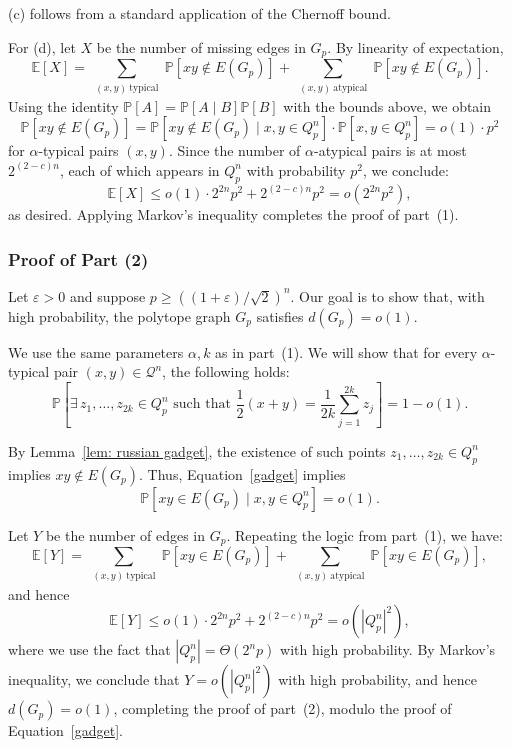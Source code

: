 \documentclass[11pt]{article}
\theoremstyle{definition}
\theoremstyle{plain}
\begin{document}
(c) follows from a standard application of the Chernoff bound.

For (d), let \( X \) be the number of missing edges in \( G_p \). By linearity of expectation,
\[
\mathbb{E}[X] = \sum_{\substack{(x, y)\ \text{typical}}} \mathbb{P}[xy \notin E(G_p)] + \sum_{\substack{(x, y)\ \text{atypical}}} \mathbb{P}[xy \notin E(G_p)].
\]
Using the identity \( \mathbb{P}[A] = \mathbb{P}[A \mid B]  \mathbb{P}[B] \) with the bounds above, we obtain
\[
\mathbb{P}[xy \notin E(G_p)] = \mathbb{P}[xy \notin E(G_p) \mid x, y \in Q_p^n] \cdot \mathbb{P}[x, y \in Q_p^n] = o(1) \cdot p^2
\]
for \(\alpha\)-typical pairs \( (x, y) \). Since the number of \(\alpha\)-atypical pairs is at most \( 2^{(2 - c)n} \), each of which appears in \( Q_p^n \) with probability \( p^2 \), we conclude:
\[
\mathbb{E}[X] \leq o(1) \cdot 2^{2n}p^2 + 2^{(2 - c)n}p^2 = o(2^{2n}p^2),
\]
as desired. Applying Markov’s inequality completes the proof of part~(1).


\subsubsection*{Proof of Part (2)}

Let \( \varepsilon > 0 \) and suppose \( p \geq \left((1 + \varepsilon)/\sqrt{2}\right)^n \). Our goal is to show that, with high probability, the polytope graph \( G_p \) satisfies \( d(G_p) = o(1) \).

We use the same parameters \( \alpha, k \) as in part~(1). We will show that for every \(\alpha\)-typical pair \( (x, y) \in \mathcal{Q}^n \), the following holds:
\begin{equation} \label{gadget}
    \mathbb{P}\left[\exists\, z_1, \ldots, z_{2k} \in Q_p^n \text{ such that } \frac{1}{2}(x + y) = \frac{1}{2k} \sum_{j=1}^{2k} z_j\right] = 1 - o(1).
\end{equation}

By Lemma~\ref{lem: russian gadget}, the existence of such points \( z_1, \ldots, z_{2k} \in Q_p^n \) implies \( xy \notin E(G_p) \). Thus, Equation~\eqref{gadget} implies
\[
\mathbb{P}[xy \in E(G_p) \mid x, y \in Q_p^n] = o(1).
\]

Let \( Y \) be the number of edges in \( G_p \). Repeating the logic from part~(1), we have:
\[
\mathbb{E}[Y] = \sum_{\substack{(x, y)\ \text{typical}}} \mathbb{P}[xy \in E(G_p)] + \sum_{\substack{(x, y)\ \text{atypical}}} \mathbb{P}[xy \in E(G_p)],
\]
and hence
\[
\mathbb{E}[Y] \leq o(1) \cdot 2^{2n}p^2 + 2^{(2 - c)n}p^2 = o(|Q_p^n|^2),
\]
where we use the fact that \( |Q_p^n| = \Theta(2^n p) \) with high probability. By Markov’s inequality, we conclude that \( Y = o(|Q_p^n|^2) \) with high probability, and hence \( d(G_p) = o(1) \), completing the proof of part~(2), modulo the proof of Equation~\eqref{gadget}.
\end{document}
